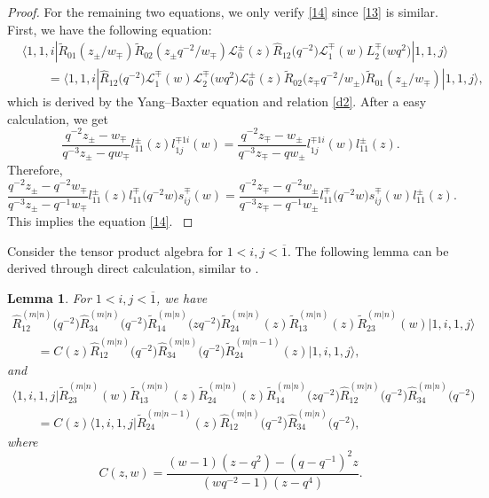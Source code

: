 \documentclass[pdftex]{sigma}
\numberwithin{equation}{section}
\newtheorem{Lemma}[Theorem]{Lemma}
\begin{document}
\begin{proof}
For the remaining two equations, we only verify \eqref{14} since \eqref{13} is similar.
First, we have the following equation:
\begin{align*}
 &\big\langle 1, 1, i|\widetilde{R}_{01}(z_{\pm}/w_{\mp})\widetilde{R}_{02}(z_{\pm}q^{-2}/w_{\mp})\mathcal{L}_0^{\pm}(z)\widehat{R}_{12}\bigl(q^{-2}\bigr)\mathcal{L}_1^{\mp}(w)L_2^{\mp}\bigl(wq^2\bigr)|1, 1, j\big\rangle\\
 &\qquad=\big\langle 1, 1, i|\widehat{R}_{12}\bigl(q^{-2}\bigr)\mathcal{L}_1^{\mp}(w)\mathcal{L}_2^{\mp}\bigl(wq^2\bigr)\mathcal{L}_0^{\pm}(z)\widetilde{R}_{02}\bigl(z_{\mp}q^{-2}/w_{\pm}\bigr)\widetilde{R}_{01}(z_{\pm}/w_{\mp})|1, 1, j\big\rangle,
\end{align*}
which is derived by the Yang--Baxter equation and relation \eqref{d2}. After a easy calculation, we get
\begin{equation*}
 \frac{q^{-2}z_{\pm}-w_{\mp}}{q^{-3}z_{\pm}-qw_{\mp}}l_{11}^{\pm}(z)l^{\mp 1i}_{1j}(w)=\frac{q^{-2}z_{\mp}-w_{\pm}}{q^{-3}z_{\mp}-qw_{\pm}}l^{\mp 1i}_{1j}(w)l_{11}^{\pm}(z).
\end{equation*}{Therefore,
\begin{equation*}
 \frac{q^{-2}z_{\pm}-q^{-2}w_{\mp}}{q^{-3}z_{\pm}-q^{-1}w_{\mp}}l_{11}^{\pm}(z)l_{11}^{\mp}\bigl(q^{-2}w\bigr)s^{\mp }_{ij}(w)=\frac{q^{-2}z_{\mp}-q^{-2}w_{\pm}}{q^{-3}z_{\mp}-q^{-1}w_{\pm}}l_{11}^{\mp}\bigl(q^{-2}w\bigr)s^{\mp }_{ij}(w)l_{11}^{\pm}(z).
\end{equation*}This implies the equation \eqref{14}. }
\end{proof}

Consider the tensor product algebra  for $1 < i, j < \overline{1}$.
The following lemma can be derived through direct calculation, similar to \cite[equations (3.25)--(3.31)]{JMA}.

\begin{Lemma}\label{le2}
For $1<i,j <\overline{1}$, we have
\begin{gather*}
 \widehat{R}_{12}^{(m|n)}\bigl(q^{-2}\bigr)\widehat{R}_{34}^{(m|n)}\bigl(q^{-2 }\bigr)\widetilde{R}_{14}^{(m|n)}\bigl(zq^{-2}\bigr)\widetilde{R}_{24}^{(m|n)}(z)\widetilde{R}_{13}^{(m|n)}(z)\widetilde{R}_{23}^{(m|n)}(w)|1, i, 1, j\rangle \nonumber\\
 \qquad=C(z)\widehat{R}_{12}^{(m|n)}\bigl(q^{-2}\bigr)\widehat{R}_{34}^{(m|n)}\bigl(q^{-2}\bigr)\widetilde{R}_{24}^{(m|n-1)}(z)|1,i, 1, j\rangle,
 \end{gather*}
 and
 \begin{gather*}
 \langle1, i, 1, j|\widetilde{R}_{23}^{(m|n)}(w)\widetilde{R}_{13}^{(m|n)}(z)\widetilde{R}_{24}^{(m|n)}(z)\widetilde{R}_{14}^{(m|n)}\bigl(zq^{-2}\bigr)\widehat{R}_{12}^{(m|n)}
 \bigl(q^{-2}\bigr)\widehat{R}_{34}^{(m|n)}\bigl(q^{-2}\bigr)\nonumber\\
 \qquad=C(z)\langle1, i, 1, j|\widetilde{R}_{24}^{(m|n-1)}(z)\widehat{R}_{12}^{(m|n)}\bigl(q^{-2}\bigr)\widehat{R}_{34}^{(m|n)}\bigl(q^{-2}\bigr),
\end{gather*}
where
\[C(z,w)
=\frac{(w-1)(z-q^{2})-(q-q^{-1})^2z}{(wq^{-2}-1)(z-q^4)}.
\]
\end{Lemma}
\end{document}
